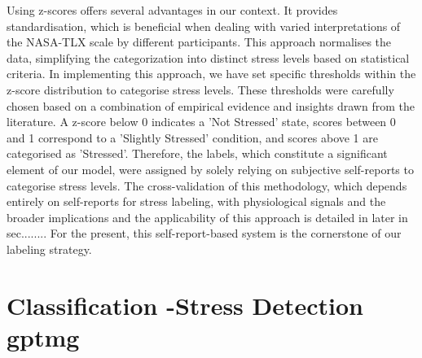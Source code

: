 Using z-scores offers several advantages in our context. It provides standardisation, which is beneficial when dealing with varied interpretations of the NASA-TLX scale by different participants. This approach normalises the data, simplifying the categorization into distinct stress levels based on statistical criteria. 
In implementing this approach, we have set specific thresholds within the z-score distribution to categorise stress levels. These thresholds were carefully chosen based on a combination of empirical evidence and insights drawn from the literature. A z-score below 0 indicates a 'Not Stressed' state, scores between 0 and 1 correspond to a 'Slightly Stressed' condition, and scores above 1 are categorised as 'Stressed'. Therefore, the labels, which constitute a significant element of our model, were assigned by solely relying on subjective self-reports to categorise stress levels. The cross-validation of this methodology, which depends entirely on self-reports for stress labeling, with physiological signals and the broader implications and the applicability of this approach is detailed in later in sec........ For the present, this self-report-based system is the cornerstone of our labeling strategy.

\section{Classification -Stress Detection \gls{gptmg}}

